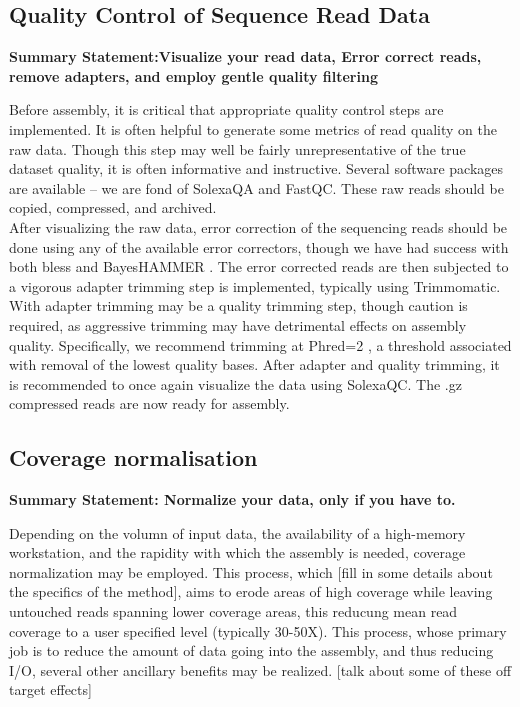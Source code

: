 \subsection{Quality Control of Sequence Read Data}
\begin{center}
\bf{Summary Statement:Visualize your read data, Error correct reads, remove adapters, and employ gentle quality filtering}
\end{center}

Before assembly, it is critical that appropriate quality control steps are implemented. It is often helpful to generate some metrics of read quality on the raw data. Though this step may well be fairly unrepresentative of the true dataset quality, it is often informative and instructive. Several software packages are available -- we are fond of SolexaQA and FastQC. These raw reads should be copied, compressed, and archived. \\

After visualizing the raw data, error correction of the sequencing reads should be done \citep{MacManes:2013ec} using any of the available error correctors, though we have had success with both bless and BayesHAMMER \citep{Nikolenko:2013iu}. The error corrected reads are then subjected to a vigorous adapter trimming step is implemented, typically using Trimmomatic. With adapter trimming may be a quality trimming step, though caution is required, as aggressive trimming may have detrimental effects on assembly quality. Specifically, we recommend trimming at Phred=2 \citep{MacManes:2014io}, a threshold associated with removal of the lowest quality bases. After adapter and quality trimming, it is recommended to once again visualize the data using SolexaQC. The .gz compressed reads are now ready for assembly. \\

\subsection{Coverage normalisation}

\begin{center}
\bf{Summary Statement: Normalize your data, only if you have to.}
\end{center}

Depending on the volumn of input data, the availability of a high-memory workstation, and the rapidity with which the assembly is needed, coverage normalization may be employed. This process, which [fill in some details about the specifics of the method], aims to erode areas of high coverage while leaving untouched reads spanning lower coverage areas, this reducung mean read coverage to a user specified level (typically 30-50X). This process, whose primary job is to reduce the amount of data going into the assembly, and thus reducing I/O, several other ancillary benefits may be realized. [talk about some of these off target effects]

